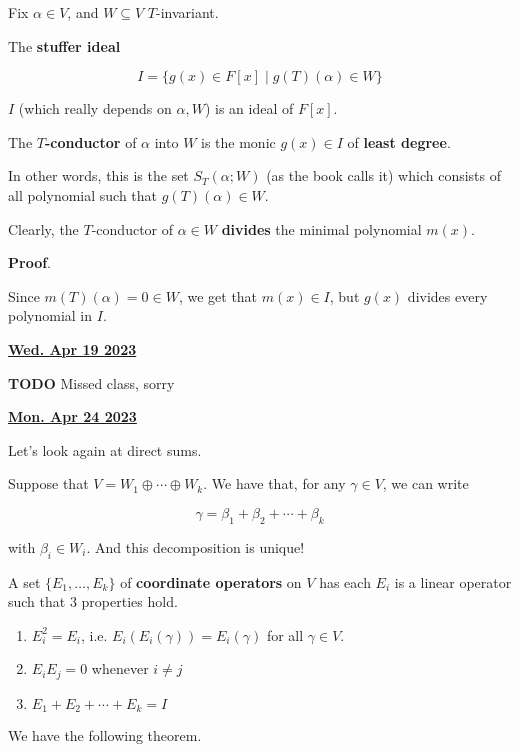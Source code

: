 \documentclass[12pt]{article}
\renewcommand{\date}[1]{\underline{\bf #1}}
\def\Tinv{$T$-invariant}
\newcommand{\TODO}{\color{red}\textbf{TODO}\color{black}}
\begin{document}
  Fix $\alpha \in V$, and $W \subseteq V$ \Tinv.

  \Definition{} {
    The {\bf stuffer ideal}

    \[
      I = \{g(x) \in F[x] \mid g(T)(\alpha) \in W\}
    \]

    $I$ (which really depends on $\alpha, W$) is an ideal of $F[x]$.
  }

  \Definition {}
  {
    The {\bf $T$-conductor} of $\alpha$ into $W$ is the monic $g(x) \in I$ of {\bf
    least degree}.

    In other words, this is the set $S_T(\alpha; W)$ (as the book calls it)
    which consists of all polynomial such that $g(T)(\alpha) \in W$.
  }

  Clearly, the $T$-conductor of $\alpha \in W$ {\bf divides} the minimal
  polynomial $m(x)$.

  {\bf Proof}.

  Since $m(T)(\alpha) = 0 \in W$, we get that $m(x) \in I$, but $g(x)$ divides
  every polynomial in $I$.

  \date{Wed. Apr 19 2023}

  \TODO{} Missed class, sorry


  \date{Mon. Apr 24 2023}

  Let's look again at direct sums.

  Suppose that $V = W_1 \oplus \cdots \oplus W_k$. We have that, for any $\gamma
  \in V$, we can write

  \[
    \gamma = \beta_1 + \beta_2 + \cdots + \beta_k
  \]

  with $\beta_i \in W_i$. And this decomposition is unique!


  \Definition {} {
    A set $\{E_1, \dots, E_k\}$ of {\bf coordinate operators} on $V$ has each
    $E_i$ is a linear operator such that $3$ properties hold.

    \begin{enumerate}
      \item $E_i^2 = E_i$, i.e. $E_i(E_i(\gamma)) = E_i(\gamma)$ for all $\gamma
        \in V$.

      \item $E_i E_j = 0$ whenever $i \ne j$

      \item $E_1 + E_2 + \cdots + E_k = I$
    \end{enumerate}
  }

  We have the following theorem.
\end{document}
